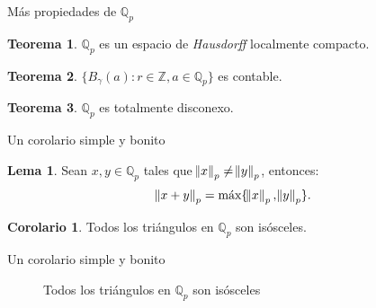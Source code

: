 \documentclass{beamer}
\newcommand{\bb}[1]{\mathbb{#1}}
\theoremstyle{definition}
\numberwithin{equation}{section}
\newcommand{\marine}[1]{\textcolor{defColor}{#1}}
\newcommand{\orangee}[1]{\textcolor{thColor}{#1}}
\newtheorem{df}{\marine{Definición}}
\newtheorem{thh}{\orangee{Teorema}}
\newtheorem{lm}{\orangee{Lema}}
\newtheorem{crr}{\orangee{Corolario}}
\newcommand{\tit}[1]{\textit{#1}}
\newcommand{\Z}{\mathbb{Z}}
\newcommand{\Qp}{\mathbb{Q}_p}
\newcommand{\pnorm}[1]{\|#1\|_p}
\newcommand{\maxx}[1]{\text{m\'ax} #1}
\begin{document}
\begin{frame}{Más propiedades de $\Qp$ }
\begin{thh}
	$\Qp$ es un espacio de \tit{Hausdorff} localmente compacto.
\end{thh}
\begin{thh}
	$\{B_\gamma (a)\colon r\in\Z, a\in\Qp\}$ es contable.
\end{thh}
\begin{thh}
	$\Qp$ es totalmente disconexo.
\end{thh}
	
	
\end{frame}

\begin{frame}{Un corolario simple y bonito}
	\begin{lm}
		Sean $x, y \in \bb{Q}_p$ tales que $\norm{x}_p \neq \norm{y}_p$, entonces:
		$$\norm{x+y}_p=\maxx\{\norm{x}_p,\norm{y}_p\}.$$
	\end{lm}
	\begin{crr}
		Todos los triángulos en $\Qp$ son isósceles.  
	\end{crr}
\end{frame}
\begin{frame}{Un corolario simple y bonito}

\begin{figure}
	\centering
	\caption{Todos los triángulos en $\bb{Q}_p$ son isósceles}
	\label{fig:1}
\end{figure}
\end{frame}
\end{document}

